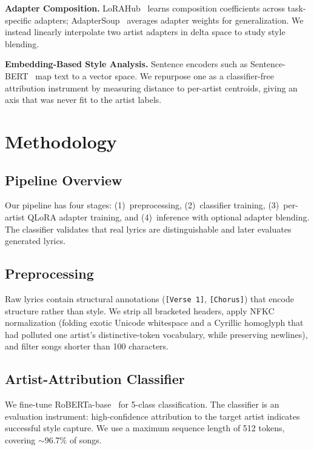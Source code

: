 \documentclass[runningheads]{llncs}
\begin{document}
\textbf{Adapter Composition.}
LoRAHub~\cite{zhang2023lorahub} learns composition coefficients across task-specific adapters; AdapterSoup~\cite{chronopoulou2023adaptersoup} averages adapter weights for generalization. We instead linearly interpolate two artist adapters in delta space to study style blending.

\textbf{Embedding-Based Style Analysis.}
Sentence encoders such as Sentence-BERT~\cite{reimers2019sentencebert} map text to a vector space. We repurpose one as a classifier-free attribution instrument by measuring distance to per-artist centroids, giving an axis that was never fit to the artist labels.

\section{Methodology}
\label{sec:method}

\subsection{Pipeline Overview}
Our pipeline has four stages: (1)~preprocessing, (2)~classifier training, (3)~per-artist QLoRA adapter training, and (4)~inference with optional adapter blending. The classifier validates that real lyrics are distinguishable and later evaluates generated lyrics.

\subsection{Preprocessing}
Raw lyrics contain structural annotations (\texttt{[Verse~1]}, \texttt{[Chorus]}) that encode structure rather than style. We strip all bracketed headers, apply NFKC normalization (folding exotic Unicode whitespace and a Cyrillic homoglyph that had polluted one artist's distinctive-token vocabulary, while preserving newlines), and filter songs shorter than 100 characters.

\subsection{Artist-Attribution Classifier}
We fine-tune RoBERTa-base~\cite{liu2019roberta} for 5-class classification. The classifier is an evaluation instrument: high-confidence attribution to the target artist indicates successful style capture. We use a maximum sequence length of 512 tokens, covering ${\sim}$96.7\% of songs.
\end{document}
